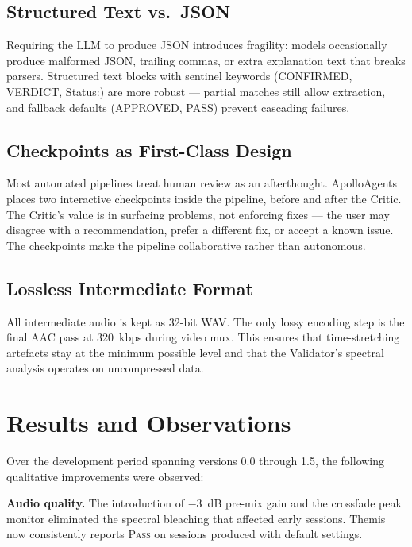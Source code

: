 \documentclass[11pt,a4paper]{article}
\begin{document}
\subsection{Structured Text vs.\ JSON}

Requiring the LLM to produce JSON introduces fragility: models occasionally
produce malformed JSON, trailing commas, or extra explanation text that breaks
parsers. Structured text blocks with sentinel keywords (CONFIRMED, VERDICT,
Status:) are more robust --- partial matches still allow extraction, and
fallback defaults (APPROVED, PASS) prevent cascading failures.

\subsection{Checkpoints as First-Class Design}

Most automated pipelines treat human review as an afterthought. ApolloAgents
places two interactive checkpoints inside the pipeline, before and after the
Critic. The Critic's value is in surfacing problems, not enforcing fixes ---
the user may disagree with a recommendation, prefer a different fix, or
accept a known issue. The checkpoints make the pipeline collaborative rather
than autonomous.

\subsection{Lossless Intermediate Format}

All intermediate audio is kept as 32-bit WAV. The only lossy encoding step is
the final AAC pass at 320~kbps during video mux. This ensures that
time-stretching artefacts stay at the minimum possible level and that the
Validator's spectral analysis operates on uncompressed data.

\section{Results and Observations}

Over the development period spanning versions 0.0 through 1.5, the following
qualitative improvements were observed:

\textbf{Audio quality.} The introduction of $-3$~dB pre-mix gain and the
crossfade peak monitor eliminated the spectral bleaching that affected early
sessions. Themis now consistently reports \textsc{Pass} on sessions produced
with default settings.
\end{document}
